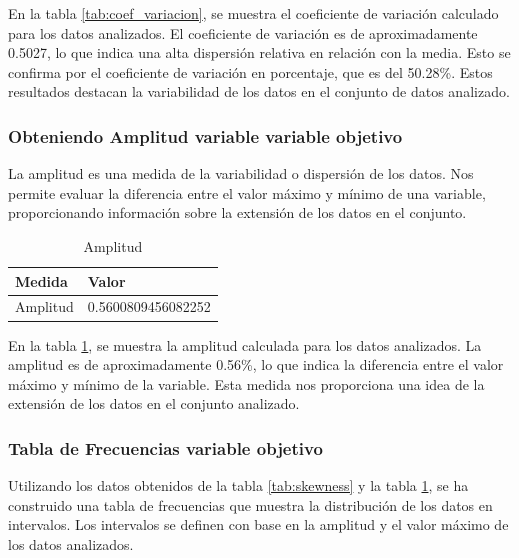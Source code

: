 En la tabla \ref{tab:coef_variacion}, se muestra el coeficiente de variación calculado para los datos analizados. El coeficiente de variación es de aproximadamente 0.5027, lo que indica una alta dispersión relativa en relación con la media. Esto se confirma por el coeficiente de variación en porcentaje, que es del 50.28\%. Estos resultados destacan la variabilidad de los datos en el conjunto de datos analizado.

\subsubsection{Obteniendo Amplitud variable variable objetivo}

La amplitud es una medida de la variabilidad o dispersión de los datos. Nos permite evaluar la diferencia entre el valor máximo y mínimo de una variable, proporcionando información sobre la extensión de los datos en el conjunto.

\begin{table}[H]
    \centering
    \caption{Amplitud}
    \begin{tabular}{ll}
        \hline
        \textbf{Medida} & \textbf{Valor}     \\
        \hline
        Amplitud        & 0.5600809456082252 \\
        \hline
    \end{tabular}%
    \label{tab:amplitud}%
\end{table}%

En la tabla \ref{tab:amplitud}, se muestra la amplitud calculada para los datos analizados. La amplitud es de aproximadamente 0.56\%, lo que indica la diferencia entre el valor máximo y mínimo de la variable. Esta medida nos proporciona una idea de la extensión de los datos en el conjunto analizado.

\subsubsection{Tabla de Frecuencias variable objetivo}

Utilizando los datos obtenidos de la tabla \ref{tab:skewness} y la tabla \ref{tab:amplitud}, se ha construido una tabla de frecuencias que muestra la distribución de los datos en intervalos. Los intervalos se definen con base en
la amplitud y el valor máximo de los datos analizados.

